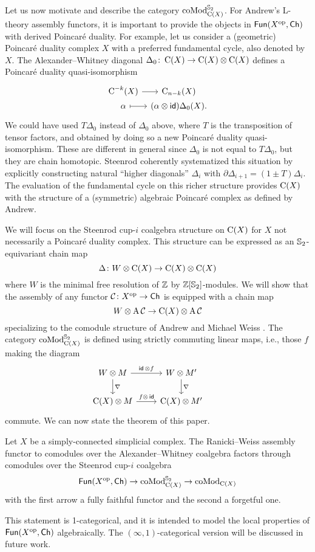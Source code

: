 Let us now motivate and describe the category $\operatorname{coMod}^{\mathbb{S}_2}_{\operatorname{C}(X)}$.
For Andrew's L-theory assembly functors, it is important to provide the objects in $\mathsf{Fun}(X^{\mathrm{op}}, \mathsf{Ch})$ with derived Poincar\'e duality.
For example, let us consider a (geometric) Poincar\'e duality complex $X$ with a preferred fundamental cycle, also denoted by $X$.
The Alexander--Whitney diagonal $\Delta_0 \colon \operatorname{C}(X) \to \operatorname{C}(X) \otimes \operatorname{C}(X)$ defines a Poincar\'e duality quasi-isomorphism
\[
\begin{tikzcd}[column sep=tiny,row sep=0]
	\cochains^{-k}(X) \arrow[r] & \chains_{n-k}(X) \\
	\alpha \arrow[r,mapsto] & (\alpha \ot \id)\Delta_0(X).
\end{tikzcd}
\]
We could have used $T\Delta_0$ instead of $\Delta_0$ above, where $T$ is the transposition of tensor factors, and obtained by doing so a new Poincar\'e duality quasi-isomorphism.
These are different in general since $\Delta_0$ is not equal to $T \Delta_0$, but they are chain homotopic.
Steenrod \cite{steenrod1947products} coherently systematized this situation by explicitly constructing natural ``higher diagonals'' $\Delta_i$ with $\partial \Delta_{i+1} = (1 \pm T) \Delta_i$.
The evaluation of the fundamental cycle on this richer structure provides $\operatorname{C}(X)$ with the structure of a (symmetric) algebraic Poincar\'e complex as defined by Andrew.

We will focus on the Steenrod cup-$i$ coalgebra structure on $\operatorname{C}(X)$ for $X$ not necessarily a Poincar\'e duality complex.
This structure can be expressed as an $\mathbb{S}_2$-equivariant chain map
\[
\Delta \colon W \otimes \operatorname{C}(X) \to \operatorname{C}(X) \otimes \operatorname{C}(X)
\]
where $W$ is the minimal free resolution of $\mathbb{Z}$ by $\mathbb{Z}[\mathbb{S}_2]$-modules.
We will show that the assembly of any functor $\mathcal{C} \colon X^{\mathrm{op}} \to \mathsf{Ch}$ is equipped with a chain map
\[
W \otimes \operatorname{A} \mathcal{C} \to \operatorname{C}(X) \otimes \operatorname{A} \mathcal{C}
\]
specializing to the comodule structure of Andrew and Michael Weiss \cite[Proposition 5.3]{ranicki1990assembly}.
The category $\operatorname{coMod}^{\mathbb{S}_2}_{\operatorname{C}(X)}$ is defined using strictly commuting linear maps, i.e., those $f$ making the diagram
\[
\begin{tikzcd}
	W \ot M \arrow[d, "\nabla"] \arrow[r, "\id\, \ot f"] &
	W \ot M' \arrow[d, "\nabla"] & \\
	\chains(X) \ot M \arrow[r, "f \ot\, \id"] &
	\chains(X) \ot M'
\end{tikzcd}
\]
commute.
We can now state the theorem of this paper.

\begin{theorem*}
	Let $X$ be a simply-connected simplicial complex.
	The Ranicki--Weiss assembly functor to comodules over the Alexander--Whitney coalgebra factors through comodules over the Steenrod cup-$i$ coalgebra
	\[
	\mathsf{Fun}(X^{\mathrm{op}}, \mathsf{Ch}) \to \operatorname{coMod}^{\mathbb{S}_2}_{\operatorname{C}(X)} \to \operatorname{coMod}_{\operatorname{C}(X)}
	\]
	with the first arrow a fully faithful functor and the second a forgetful one.
\end{theorem*}

This statement is 1-categorical, and it is intended to model the local properties of $\mathsf{Fun}(X^{\mathrm{op}},\mathsf{Ch})$ algebraically.
The $(\infty,1)$-categorical version will be discussed in future work.